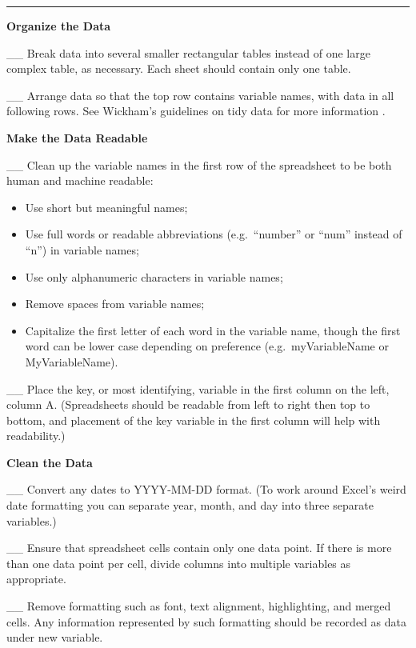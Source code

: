 \documentclass[
]{book}
\providecommand{\tightlist}{%
  \setlength{\itemsep}{0pt}\setlength{\parskip}{0pt}}
\begin{document}
\begin{center}\rule{0.5\linewidth}{0.5pt}\end{center}

\textbf{Organize the Data}

\_\_ Break data into several smaller rectangular tables instead of one large complex table, as necessary. Each sheet should contain only one table.

\_\_ Arrange data so that the top row contains variable names, with data in all following rows. See Wickham's guidelines on tidy data for more information \citep{wickham_tidy_2014}.

\textbf{Make the Data Readable}

\_\_ Clean up the variable names in the first row of the spreadsheet to be both human and machine readable:

\begin{itemize}
\tightlist
\item
  Use short but meaningful names;
\item
  Use full words or readable abbreviations (e.g.~``number'' or ``num'' instead of ``n'') in variable names;
\item
  Use only alphanumeric characters in variable names;
\item
  Remove spaces from variable names;
\item
  Capitalize the first letter of each word in the variable name, though the first word can be lower case depending on preference (e.g.~myVariableName or MyVariableName).
\end{itemize}

\_\_ Place the key, or most identifying, variable in the first column on the left, column A. (Spreadsheets should be readable from left to right then top to bottom, and placement of the key variable in the first column will help with readability.)

\textbf{Clean the Data}

\_\_ Convert any dates to YYYY-MM-DD format. (To work around Excel's weird date formatting you can separate year, month, and day into three separate variables.)

\_\_ Ensure that spreadsheet cells contain only one data point. If there is more than one data point per cell, divide columns into multiple variables as appropriate.

\_\_ Remove formatting such as font, text alignment, highlighting, and merged cells. Any information represented by such formatting should be recorded as data under new variable.
\end{document}

